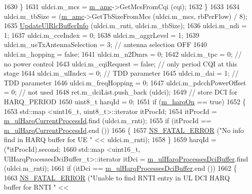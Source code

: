 \begin{DoxyCode}
1630             \}
1631           uldci.m\_mcs = \hyperlink{classns3_1_1TdMtFfMacScheduler_a2fa1c7abd867e10a52fcd0de82dc6cc1}{m\_amc}->GetMcsFromCqi (cqi);
1632         \}
1633 
1634       uldci.m\_tbSize = (\hyperlink{classns3_1_1TdMtFfMacScheduler_a2fa1c7abd867e10a52fcd0de82dc6cc1}{m\_amc}->GetTbSizeFromMcs (uldci.m\_mcs, rbPerFlow) / 8);
1635       \hyperlink{classns3_1_1TdMtFfMacScheduler_a708ecc36d39c627b394ac082a6bc14a5}{UpdateUlRlcBufferInfo} (uldci.m\_rnti, uldci.m\_tbSize);
1636       uldci.m\_ndi = 1;
1637       uldci.m\_cceIndex = 0;
1638       uldci.m\_aggrLevel = 1;
1639       uldci.m\_ueTxAntennaSelection = 3; \textcolor{comment}{// antenna selection OFF}
1640       uldci.m\_hopping = \textcolor{keyword}{false};
1641       uldci.m\_n2Dmrs = 0;
1642       uldci.m\_tpc = 0; \textcolor{comment}{// no power control}
1643       uldci.m\_cqiRequest = \textcolor{keyword}{false}; \textcolor{comment}{// only period CQI at this stage}
1644       uldci.m\_ulIndex = 0; \textcolor{comment}{// TDD parameter}
1645       uldci.m\_dai = 1; \textcolor{comment}{// TDD parameter}
1646       uldci.m\_freqHopping = 0;
1647       uldci.m\_pdcchPowerOffset = 0; \textcolor{comment}{// not used}
1648       ret.m\_dciList.push\_back (uldci);
1649       \textcolor{comment}{// store DCI for HARQ\_PERIOD}
1650       uint8\_t harqId = 0;
1651       \textcolor{keywordflow}{if} (\hyperlink{classns3_1_1TdMtFfMacScheduler_af0253034544a704cb4d8583fae9377a3}{m\_harqOn} == \textcolor{keyword}{true})
1652         \{
1653           std::map <uint16\_t, uint8\_t>::iterator itProcId;
1654           itProcId = \hyperlink{classns3_1_1TdMtFfMacScheduler_a01393611d03f7107ec6c0a0db95858c2}{m\_ulHarqCurrentProcessId}.find (uldci.m\_rnti);
1655           \textcolor{keywordflow}{if} (itProcId == \hyperlink{classns3_1_1TdMtFfMacScheduler_a01393611d03f7107ec6c0a0db95858c2}{m\_ulHarqCurrentProcessId}.end ())
1656             \{
1657               \hyperlink{group__fatal_ga5131d5e3f75d7d4cbfd706ac456fdc85}{NS\_FATAL\_ERROR} (\textcolor{stringliteral}{"No info find in HARQ buffer for UE "} << uldci.m\_rnti);
1658             \}
1659           harqId = (*itProcId).second;
1660           std::map <uint16\_t, UlHarqProcessesDciBuffer\_t>::iterator itDci = 
      \hyperlink{classns3_1_1TdMtFfMacScheduler_a25c9425db7dae9dad47cd58ae3b70faf}{m\_ulHarqProcessesDciBuffer}.find (uldci.m\_rnti);
1661           \textcolor{keywordflow}{if} (itDci == \hyperlink{classns3_1_1TdMtFfMacScheduler_a25c9425db7dae9dad47cd58ae3b70faf}{m\_ulHarqProcessesDciBuffer}.end ())
1662             \{
1663               \hyperlink{group__fatal_ga5131d5e3f75d7d4cbfd706ac456fdc85}{NS\_FATAL\_ERROR} (\textcolor{stringliteral}{"Unable to find RNTI entry in UL DCI HARQ buffer for RNTI "} << 

\end{DoxyCode}
